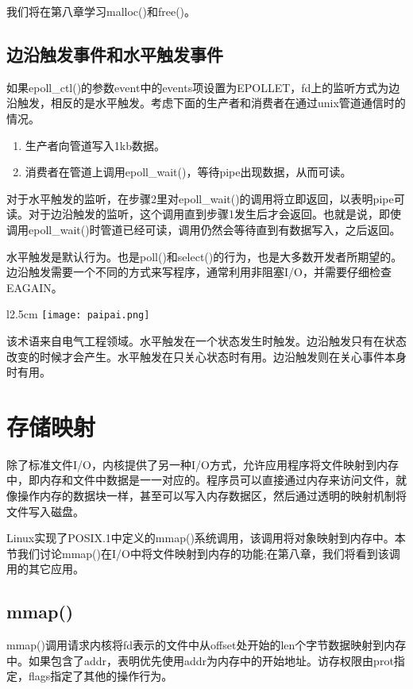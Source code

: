 我们将在第八章学习malloc()和free()。

\subsection{边沿触发事件和水平触发事件}

如果epoll\_ctl()的参数event中的events项设置为EPOLLET，fd上的监听方式为边沿触发，相反的是水平触发。考虑下面的生产者和消费者在通过unix管道通信时的情况。

\begin{enumerate}
\item 生产者向管道写入1kb数据。
\item 消费者在管道上调用epoll\_wait()，等待pipe出现数据，从而可读。
\end{enumerate}

对于水平触发的监听，在步骤2里对epoll\_wait()的调用将立即返回，以表明pipe可读。对于边沿触发的监听，这个调用直到步骤1发生后才会返回。也就是说，即使调用epoll\_wait()时管道已经可读，调用仍然会等待直到有数据写入，之后返回。

水平触发是默认行为。也是poll()和select()的行为，也是大多数开发者所期望的。边沿触发需要一个不同的方式来写程序，通常利用非阻塞I/O，并需要仔细检查EAGAIN。

\begin{wrapfigure}{l}{2.5cm}
  \texttt{[image: paipai.png]}
\end{wrapfigure}
\mbox{}该术语来自电气工程领域。水平触发在一个状态发生时触发。边沿触发只有在状态改变的时候才会产生。水平触发在只关心状态时有用。边沿触发则在关心事件本身时有用。
 
\section{存储映射}

除了标准文件I/O，内核提供了另一种I/O方式，允许应用程序将文件映射到内存中，即内存和文件中数据是一一对应的。程序员可以直接通过内存来访问文件，就像操作内存的数据块一样，甚至可以写入内存数据区，然后通过透明的映射机制将文件写入磁盘。

Linux实现了POSIX.1中定义的mmap()系统调用，该调用将对象映射到内存中。本节我们讨论mmap()在I/O中将文件映射到内存的功能;在第八章，我们将看到该调用的其它应用。

\subsection{mmap()}

mmap()调用请求内核将fd表示的文件中从offset处开始的len个字节数据映射到内存中。如果包含了addr，表明优先使用addr为内存中的开始地址。访存权限由prot指定，flags指定了其他的操作行为。

